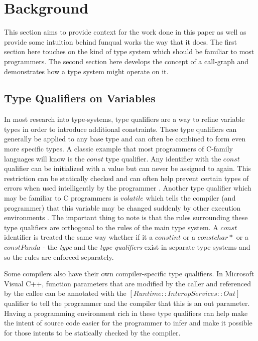\chapter{Background}\label{sec:background}

This section aims to provide context for the work done in this paper as well as provide some intuition behind funqual works the way that it does.  The first section here touches on the kind of type system which should be familiar to most programmers.  The second section here develops the concept of a call-graph and demonstrates how a type system might operate on it.

\section{Type Qualifiers on Variables}\label{sec:bac:varqual}

In most research into type-systems, type qualifiers are a way to refine variable types in order to introduce additional constraints.  These type qualifiers can generally be applied to any base type and can often be combined to form even more specific types.  A classic example that most programmers of C-family languages will know is the $const$ type qualifier.  Any identifier with the $const$ qualifier can be initialized with a value but can never be assigned to again.  This restriction can be statically checked and can often help prevent certain types of errors when used intelligently by the programmer \cite{theory-of-qual}.  Another type qualifier which may be familiar to C programmers is $volatile$ which tells the compiler (and programmer) that this variable may be changed suddenly by other execution environments \cite{theory-of-qual}.  The important thing to note is that the rules surrounding these type qualifiers are orthogonal to the rules of the main type system.  A $const$ identifier is treated the same way whether if it a $const int$ or a $const char*$ or a $const Panda$ - the \textit{type} and the \textit{type qualifiers} exist in separate type systems and so the rules are enforced separately.  

Some compilers also have their own compiler-specific type qualifiers.  In Microsoft Visual C++, function parameters that are modified by the caller and referenced by the callee can be annotated with the $[Runtime::InteropServices::Out]$ qualifier to tell the programmer and the compiler that this is an out parameter.  Having a programming environment rich in these type qualifiers can help make the intent of source code easier for the programmer to infer and make it possible for those intents to be statically checked by the compiler.  

